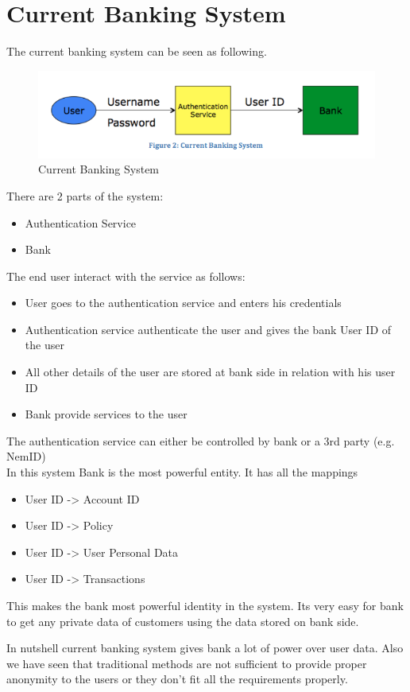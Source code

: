 \section{Current Banking System}
The current banking system can be seen as following.
\begin{figure}[h]
	\centering
	\includegraphics[width=\textwidth]{figures/Current}
	\caption{Current Banking System}
	\label{fig:Current}
\end{figure}
There are 2 parts of the system:
\begin{itemize}
	\item Authentication Service 
	\item Bank
\end{itemize}
The end user interact with the service as follows:
\begin{itemize}
\item User goes to the authentication service and enters his credentials
\item Authentication service authenticate the user and gives the bank User ID of the user
\item All other details of the user are stored at bank side in relation with his user ID
\item Bank provide services to the user 
\end{itemize}
The authentication service can either be controlled by bank or a 3rd party (e.g. NemID)
\\In this system Bank is the most powerful entity. It has all the mappings
\begin{itemize}
	\item User ID -> Account ID
	\item User ID -> Policy
	\item User ID -> User Personal Data
	\item User ID -> Transactions
\end{itemize}
This makes the bank most powerful identity in the system. Its very easy for bank to get any private data of customers using the data stored on bank side.

In nutshell current banking system gives bank a lot of power over user data. Also we have seen that traditional methods are not sufficient to provide proper anonymity to the users or they don't fit all the requirements properly.